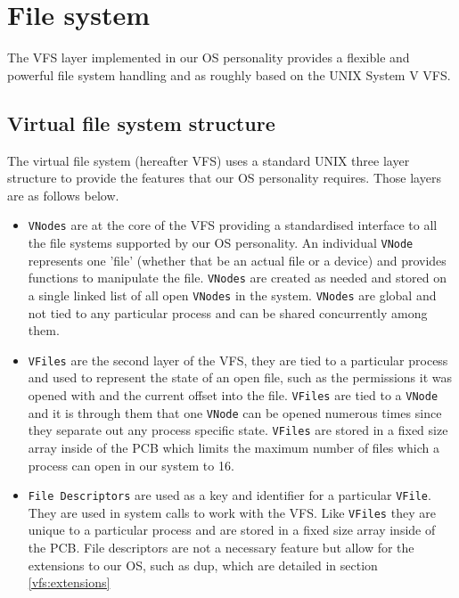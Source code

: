 \documentclass[12pt,english]{article}
\begin{document}

\newpage{}
\section{File system} \label{vfs}

The VFS layer implemented in our OS personality provides a flexible and powerful file system handling and as roughly based on the UNIX System V VFS.

\subsection{Virtual file system structure} \label{vfs:vfs_struct}

The virtual file system (hereafter VFS) uses a standard UNIX three layer structure to provide the features that our OS personality requires. Those layers are as follows below.

\begin{itemize}
\item \texttt{VNodes} are at the core of the VFS providing a standardised interface to all the file systems supported by our OS personality. An individual \texttt{VNode} represents one 'file' (whether that be an actual file or a device) and provides functions to manipulate the file. \texttt{VNodes} are created as needed and stored on a single linked list of all open \texttt{VNodes} in the system. \texttt{VNodes} are global and not tied to any particular process and can be shared concurrently among them.
\item \texttt{VFiles} are the second layer of the VFS, they are tied to a particular process and used to represent the state of an open file, such as the permissions it was opened with and the current offset into the file. \texttt{VFiles} are tied to a \texttt{VNode} and it is through them that one \texttt{VNode} can be opened numerous times since they separate out any process specific state. \texttt{VFiles} are stored in a fixed size array inside of the PCB which limits the maximum number of files which a process can open in our system to 16.
\item \texttt{File Descriptors} are used as a key and identifier for a particular \texttt{VFile}. They are used in system calls to work with the VFS. Like \texttt{VFiles} they are unique to a particular process and are stored in a fixed size array inside of the PCB. File descriptors are not a necessary feature but allow for the extensions to our OS, such as dup, which are detailed in section \ref{vfs:extensions}
\end{itemize}
\end{document}
